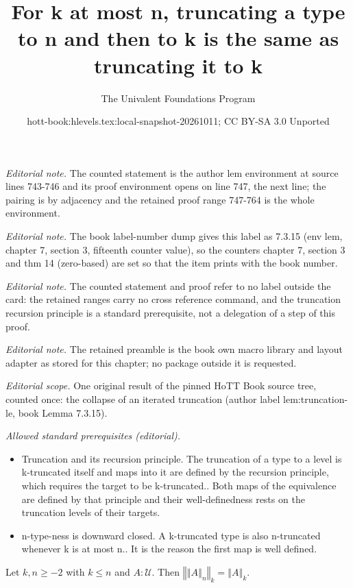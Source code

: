 \documentclass[10pt,a4paper]{article}
\title{For k at most n, truncating a type to n and then to k is the same as truncating it to k}
\author{The Univalent Foundations Program}
\date{hott-book:hlevels.tex:local-snapshot-20261011; CC BY-SA 3.0 Unported}
\newcounter{chapter}
\newcommand{\UU}{\ensuremath{\mathcal{U}}\xspace}
\let\type\UU
\newcommand{\trunc}[2]{\mathopen{}\left\Vert #2\right\Vert_{#1}\mathclose{}}
\theoremstyle{definition}
\theoremstyle{remark}
\numberwithin{equation}{section}
\begin{document}
\maketitle
\setcounter{chapter}{7}
\setcounter{section}{3}
\setcounter{thm}{14}
\noindent\textit{Editorial note.} The counted statement is the author lem environment at source lines 743-746 and its proof environment opens on line 747, the next line; the pairing is by adjacency and the retained proof range 747-764 is the whole environment.\par\medskip
\noindent\textit{Editorial note.} The book label-number dump gives this label as 7.3.15 (env lem, chapter 7, section 3, fifteenth counter value), so the counters chapter 7, section 3 and thm 14 (zero-based) are set so that the item prints with the book number.\par\medskip
\noindent\textit{Editorial note.} The counted statement and proof refer to no label outside the card: the retained ranges carry no cross reference command, and the truncation recursion principle is a standard prerequisite, not a delegation of a step of this proof.\par\medskip
\noindent\textit{Editorial note.} The retained preamble is the book own macro library and layout adapter as stored for this chapter; no package outside it is requested.\par\medskip
\noindent\textit{Editorial scope.} One original result of the pinned HoTT Book source tree, counted once: the collapse of an iterated truncation (author label lem:truncation-le, book Lemma 7.3.15).\par\medskip
\noindent\textit{Allowed standard prerequisites (editorial).}\begin{itemize}
\item Truncation and its recursion principle. The truncation of a type to a level is k-truncated itself and maps into it are defined by the recursion principle, which requires the target to be k-truncated.. Both maps of the equivalence are defined by that principle and their well-definedness rests on the truncation levels of their targets.
\item n-type-ness is downward closed. A k-truncated type is also n-truncated whenever k is at most n.. It is the reason the first map is well defined.
\end{itemize}\medskip
\begin{lem} \label{lem:truncation-le}
  Let $k,n\ge-2$ with $k\le{}n$ and $A:\type$. Then
  $\trunc k{\trunc nA}=\trunc kA$.
\end{lem}
\end{document}
